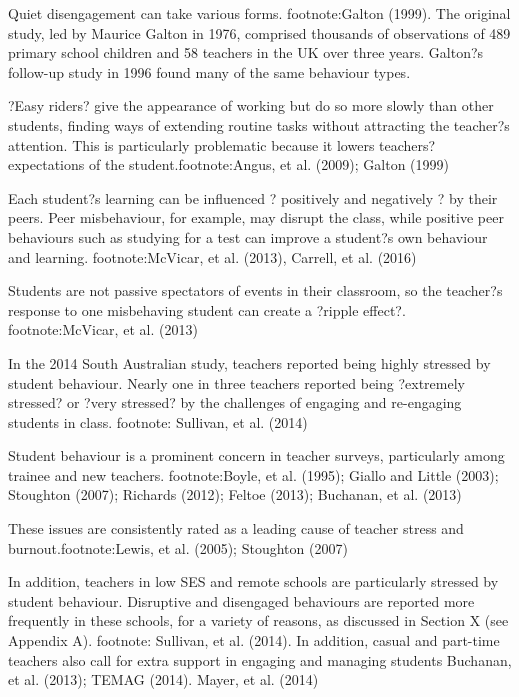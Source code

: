 Quiet disengagement can take various forms. footnote:Galton (1999). The original study, led by Maurice Galton in 1976, comprised thousands of observations of 489 primary school children and 58 teachers in the UK over three years. Galton?s follow-up study in 1996 found many of the same behaviour types.

?Easy riders? give the appearance of working but do so more slowly than other students, finding ways of extending routine tasks without attracting the teacher?s attention. This is particularly problematic because it lowers teachers? expectations of the student.footnote:Angus, et al. (2009); Galton (1999)

Each student?s learning can be influenced ? positively and negatively ? by their peers.  Peer misbehaviour, for example, may disrupt the class, while positive peer behaviours such as studying for a test can improve a student?s own behaviour and learning. footnote:McVicar, et al. (2013), Carrell, et al. (2016)

Students are not passive spectators of events in their classroom, so the teacher?s response to one misbehaving student can create a ?ripple effect?. footnote:McVicar, et al. (2013)

In the 2014 South Australian study, teachers reported being highly stressed by student behaviour. Nearly one in three teachers reported being ?extremely stressed? or ?very stressed? by the challenges of engaging and re-engaging students in class.  footnote: Sullivan, et al. (2014)


Student behaviour is a prominent concern in teacher surveys, particularly among trainee and new teachers. footnote:Boyle, et al. (1995); Giallo and Little (2003); Stoughton (2007); Richards (2012); Feltoe (2013); Buchanan, et al. (2013)

These issues are consistently rated as a leading cause of teacher stress and burnout.footnote:Lewis, et al. (2005); Stoughton (2007)

In addition, teachers in low SES and remote schools are particularly stressed by student behaviour. Disruptive and disengaged behaviours are reported more frequently in these schools, for a variety of reasons, as discussed in Section X (see Appendix A). footnote:  Sullivan, et al. (2014). In addition, casual and part-time teachers also call for extra support in engaging and managing students Buchanan, et al. (2013); TEMAG (2014). Mayer, et al. (2014)

